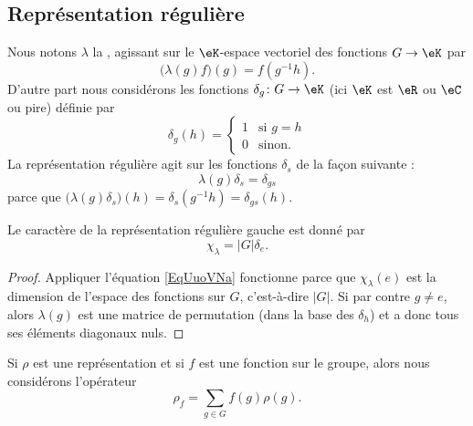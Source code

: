 \subsection{Représentation régulière}

Nous notons \( \lambda\) la , agissant sur le \( \eK\)-espace vectoriel des fonctions \( G\to \eK\) par
\begin{equation}
	\Big( \lambda(g)f \Big)(g)=f(g^{-1}h).
\end{equation}
D'autre part nous considérons les fonctions \( \delta_g\colon G\to \eK\) (ici \( \eK\) est \( \eR\) ou \( \eC\) ou pire) définie par
\begin{equation}
	\delta_g(h)=\begin{cases}
		1 & \text{si } g=h \\
		0 & \text{sinon.}
	\end{cases}
\end{equation}
La représentation régulière agit sur les fonctions \( \delta_s\) de la façon suivante :
\begin{equation}
	\lambda(g)\delta_s=\delta_{gs}
\end{equation}
parce que \( \big( \lambda(g)\delta_s \big)(h)=\delta_s(g^{-1}h)=\delta_{gs}(h)\).

\begin{lemma}
	Le caractère de la représentation régulière gauche est donné par
	\begin{equation}        \label{EqUuoVNa}
		\chi_{\lambda}=| G |\delta_e.
	\end{equation}
\end{lemma}

\begin{proof}
	Appliquer l'équation \eqref{EqUuoVNa} fonctionne parce que \( \chi_{\lambda}(e)\) est la dimension de l'espace des fonctions sur \( G\), c'est-à-dire \( | G |\). Si par contre \( g\neq e\), alors \( \lambda(g)\) est une matrice de permutation (dans la base des \( \delta_h\)) et a donc tous ses éléments diagonaux nuls.
\end{proof}

Si \( \rho\) est une représentation et si \( f\) est une fonction sur le groupe, alors nous considérons l'opérateur
\begin{equation}
	\rho_f=\sum_{g\in G}f(g)\rho(g).
\end{equation}

